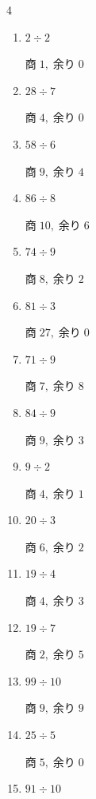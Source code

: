 \begin{multicols}{4}
\begin{enumerate}
        $商\; 40,\; 余り\; 1$

  \item $2 \div 2$

        $商\; 1,\; 余り\; 0$

  \item $28 \div 7$

        $商\; 4,\; 余り\; 0$

  \item $58 \div 6$

        $商\; 9,\; 余り\; 4$

  \item $86 \div 8$

        $商\; 10,\; 余り\; 6$

  \item $74 \div 9$

        $商\; 8,\; 余り\; 2$

  \item $81 \div 3$

        $商\; 27,\; 余り\; 0$

  \item $71 \div 9$

        $商\; 7,\; 余り\; 8$

  \item $84 \div 9$

        $商\; 9,\; 余り\; 3$

  \item $9 \div 2$

        $商\; 4,\; 余り\; 1$

  \item $20 \div 3$

        $商\; 6,\; 余り\; 2$

  \item $19 \div 4$

        $商\; 4,\; 余り\; 3$

  \item $19 \div 7$

        $商\; 2,\; 余り\; 5$

\columnbreak %

  \item $99 \div 10$

        $商\; 9,\; 余り\; 9$

  \item $25 \div 5$

        $商\; 5,\; 余り\; 0$

  \item $91 \div 10$


\end{enumerate}
\end{multicols}
